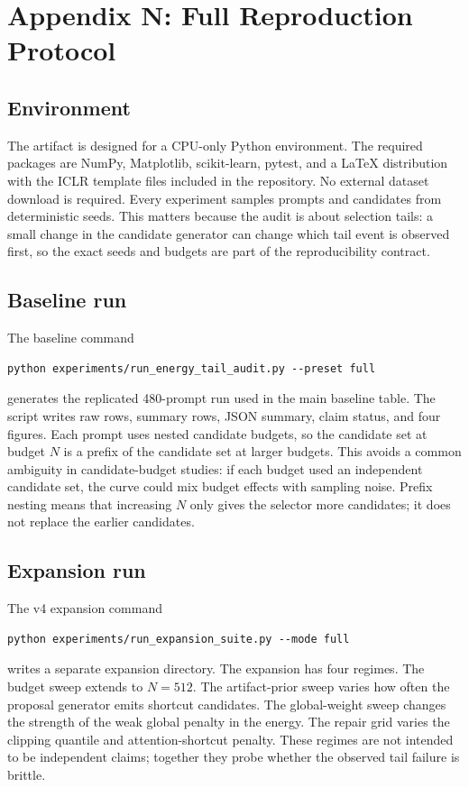 \documentclass{article}
\begin{document}
\section{Appendix N: Full Reproduction Protocol}

\subsection{Environment}

The artifact is designed for a CPU-only Python environment. The required
packages are NumPy, Matplotlib, scikit-learn, pytest, and a LaTeX distribution
with the ICLR template files included in the repository. No external dataset
download is required. Every experiment samples prompts and candidates from
deterministic seeds. This matters because the audit is about selection tails: a
small change in the candidate generator can change which tail event is observed
first, so the exact seeds and budgets are part of the reproducibility contract.

\subsection{Baseline run}

The baseline command
\begin{verbatim}
python experiments/run_energy_tail_audit.py --preset full
\end{verbatim}
generates the replicated 480-prompt run used in the main baseline table. The
script writes raw rows, summary rows, JSON summary, claim status, and four
figures. Each prompt uses nested candidate budgets, so the candidate set at
budget $N$ is a prefix of the candidate set at larger budgets. This avoids a
common ambiguity in candidate-budget studies: if each budget used an
independent candidate set, the curve could mix budget effects with sampling
noise. Prefix nesting means that increasing $N$ only gives the selector more
candidates; it does not replace the earlier candidates.

\subsection{Expansion run}

The v4 expansion command
\begin{verbatim}
python experiments/run_expansion_suite.py --mode full
\end{verbatim}
writes a separate expansion directory. The expansion has four regimes. The
budget sweep extends to $N=512$. The artifact-prior sweep varies how often the
proposal generator emits shortcut candidates. The global-weight sweep changes
the strength of the weak global penalty in the energy. The repair grid varies
the clipping quantile and attention-shortcut penalty. These regimes are not
intended to be independent claims; together they probe whether the observed
tail failure is brittle.
\end{document}
